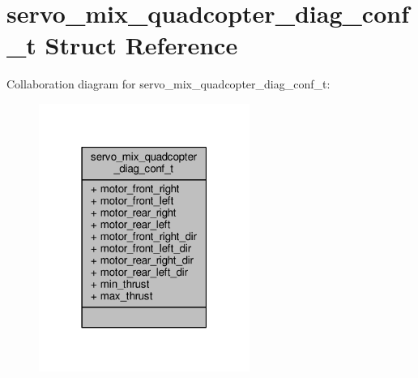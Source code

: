 \hypertarget{structservo__mix__quadcopter__diag__conf__t}{\section{servo\+\_\+mix\+\_\+quadcopter\+\_\+diag\+\_\+conf\+\_\+t Struct Reference}
\label{structservo__mix__quadcopter__diag__conf__t}
}


Collaboration diagram for servo\+\_\+mix\+\_\+quadcopter\+\_\+diag\+\_\+conf\+\_\+t\+:
\nopagebreak
\begin{figure}[H]
\begin{center}
\leavevmode
\includegraphics[width=195pt]{structservo__mix__quadcopter__diag__conf__t__coll__graph}
\end{center}
\end{figure}
